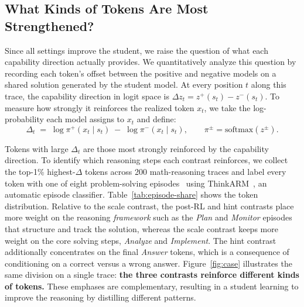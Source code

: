 \documentclass{article}
\begin{document}
\subsection{What Kinds of Tokens Are Most Strengthened?}
\label{sec:case}
Since all settings improve the student, we raise the question of what each capability direction actually provides. We quantitatively analyze this question by recording each token's offset between the positive and negative models on a shared solution generated by the student model. At every position $t$ along this trace, the capability direction in logit space is
$\Delta z_t = z^{+}(s_t) - z^{-}(s_t)$. To measure how strongly it reinforces the realized token $x_t$, we take the log-probability each model assigns to $x_t$ and define:
\begin{equation}
\label{eq:delta}
\Delta_t \;=\; \log \pi^{+}(x_t \mid s_t) \;-\; \log \pi^{-}(x_t \mid s_t),
\qquad \pi^{\pm}=\mathrm{softmax}(z^{\pm}).
\end{equation}

Tokens with large $\Delta_t$ are those most strongly reinforced by the
capability direction. To identify which reasoning steps each contrast reinforces, we collect the top-1\% highest-$\Delta$ tokens across 200 math-reasoning traces and label every token with one of eight problem-solving episodes~\citep{schoenfeld2014mathematical} using ThinkARM~\citep{li2026schoenfeld}, an automatic episode classifier. Table~\ref{tab:episode-share} shows the token distribution. Relative to the scale contrast, the post-RL and hint contrasts place more weight on the reasoning \emph{framework} such as the \textit{Plan} and \textit{Monitor} episodes that structure and track the solution, whereas the scale contrast keeps more weight on the core solving steps, \textit{Analyze} and \textit{Implement}. The hint contrast additionally concentrates on the final \textit{Answer} tokens, which is a consequence of conditioning on a correct versus a wrong answer.
Figure~\ref{fig:case} illustrates the same division on a single trace: \textbf{the three contrasts reinforce different kinds of tokens.} These emphases are complementary, resulting in a student learning to improve the reasoning by distilling different patterns.
\end{document}

